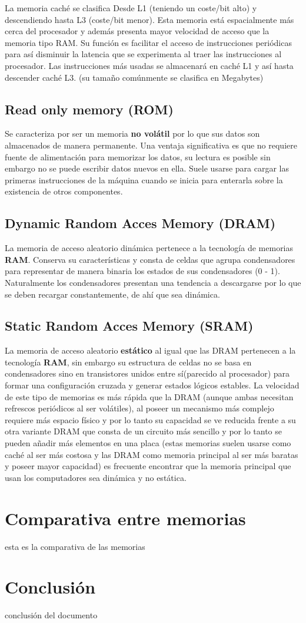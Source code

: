 \documentclass{article}
\begin{document}
La memoria caché se clasifica Desde L1 (teniendo un coste/bit alto) y descendiendo hasta L3 (coste/bit menor). Esta memoria está espacialmente más cerca del procesador y además presenta mayor velocidad de acceso que la memoria tipo RAM. Su función es facilitar el acceso de instrucciones 
 periódicas 
 para así disminuir la latencia que se experimenta al traer las instrucciones al procesador. Las instrucciones más usadas se almacenará en caché L1 y así hasta descender caché L3.
(su tamaño comúnmente se clasifica en Megabytes)


\subsection{Read only memory (ROM)}
Se caracteriza por ser un memoria \textbf
{no volátil} por lo que sus datos son almacenados de manera permanente. Una ventaja significativa es que no requiere fuente de alimentación para memorizar los datos, su lectura es posible sin embargo no se puede escribir datos nuevos en ella. Suele usarse para cargar las primeras instrucciones de la máquina cuando se inicia para enterarla sobre la existencia de otros componentes.


\subsection{Dynamic Random Acces Memory (DRAM)}
La memoria de acceso aleatorio dinámica pertenece a la tecnología de memorias \textbf{RAM}. Conserva su características y consta de celdas que agrupa condensadores para representar de manera binaria los estados de sus condensadores (0 - 1). Naturalmente los condensadores presentan una tendencia a descargarse por lo que se deben recargar constantemente, de ahí que sea dinámica.

\subsection{Static Random Acces Memory (SRAM)}
La memoria de acceso aleatorio \textbf
{estático} al igual que las DRAM pertenecen a la tecnología \textbf
{RAM}, sin embargo su estructura de celdas no se basa en condensadores sino en transistores unidos entre sí(parecido al procesador) para formar una configuración cruzada y generar estados lógicos estables. La velocidad de este tipo de memorias es más rápida que la DRAM (aunque ambas necesitan refrescos periódicos al ser volátiles), al poseer un mecanismo más complejo requiere más espacio físico y por lo tanto su capacidad se ve reducida frente a su otra variante DRAM que consta de un circuito más sencillo y por lo tanto se pueden añadir más elementos en una placa
(estas memorias suelen usarse como caché al ser más costosa y las DRAM como memoria principal al ser más baratas y poseer mayor capacidad) es frecuente encontrar que la memoria principal que usan los computadores sea dinámica y no estática.

\section{Comparativa entre memorias}
 esta es la comparativa de las memorias

\section{Conclusión} 
conclusión del documento





\cite{rebollo}
\cite{figura1}
\end{document}
